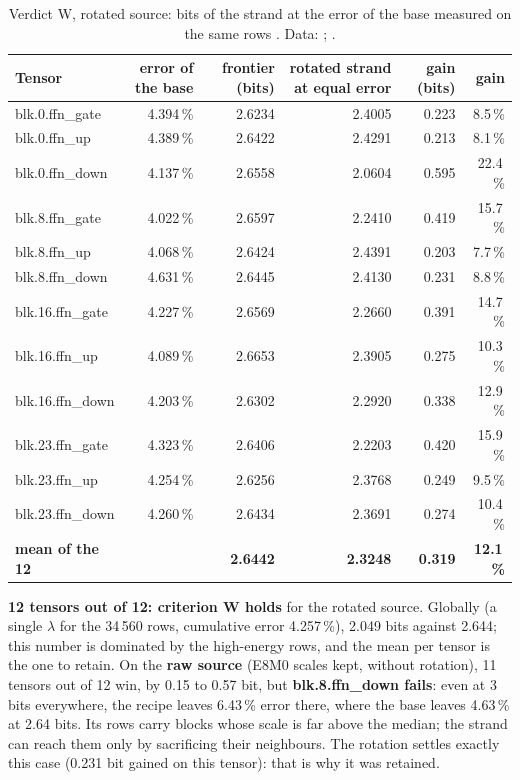 \begin{table}[tbp]
\centering\small
\begin{tabular}{l r r r r r}
\toprule
Tensor & error of the base & frontier (bits) & rotated strand at equal error & gain (bits) & gain \\
\midrule
blk.0.ffn\_gate & 4.394\,\% & 2.6234 & 2.4005 & 0.223 & 8.5\,\% \\
blk.0.ffn\_up & 4.389\,\% & 2.6422 & 2.4291 & 0.213 & 8.1\,\% \\
blk.0.ffn\_down & 4.137\,\% & 2.6558 & 2.0604 & 0.595 & 22.4\,\% \\
blk.8.ffn\_gate & 4.022\,\% & 2.6597 & 2.2410 & 0.419 & 15.7\,\% \\
blk.8.ffn\_up & 4.068\,\% & 2.6424 & 2.4391 & 0.203 & 7.7\,\% \\
blk.8.ffn\_down & 4.631\,\% & 2.6445 & 2.4130 & 0.231 & 8.8\,\% \\
blk.16.ffn\_gate & 4.227\,\% & 2.6569 & 2.2660 & 0.391 & 14.7\,\% \\
blk.16.ffn\_up & 4.089\,\% & 2.6653 & 2.3905 & 0.275 & 10.3\,\% \\
blk.16.ffn\_down & 4.203\,\% & 2.6302 & 2.2920 & 0.338 & 12.9\,\% \\
blk.23.ffn\_gate & 4.323\,\% & 2.6406 & 2.2203 & 0.420 & 15.9\,\% \\
blk.23.ffn\_up & 4.254\,\% & 2.6256 & 2.3768 & 0.249 & 9.5\,\% \\
blk.23.ffn\_down & 4.260\,\% & 2.6434 & 2.3691 & 0.274 & 10.4\,\% \\
\midrule
\textbf{mean of the 12} & & \textbf{2.6442} & \textbf{2.3248} & \textbf{0.319} & \textbf{12.1\,\%} \\
\bottomrule
\end{tabular}
\caption[Verdict W, tensor by tensor]{Verdict W, rotated source: bits of the strand at the error of the base measured on the same rows \mes. Data: ; .}
\label{t3gen:tab:verdict}
\end{table}

\textbf{12 tensors out of 12: criterion W holds} for the rotated source. Globally (a single $\lambda$ for the 34\,560 rows, cumulative error 4.257\,\%), 2.049 bits against 2.644; this number is dominated by the high-energy rows, and the mean per tensor is the one to retain. On the \textbf{raw source} (E8M0 scales kept, without rotation), 11 tensors out of 12 win, by 0.15 to 0.57 bit, but \textbf{blk.8.ffn\_down fails}: even at 3 bits everywhere, the recipe leaves 6.43\,\% error there, where the base leaves 4.63\,\% at 2.64 bits. Its rows carry blocks whose scale is far above the median; the strand can reach them only by sacrificing their neighbours. The rotation settles exactly this case (0.231 bit gained on this tensor): that is why it was retained.

